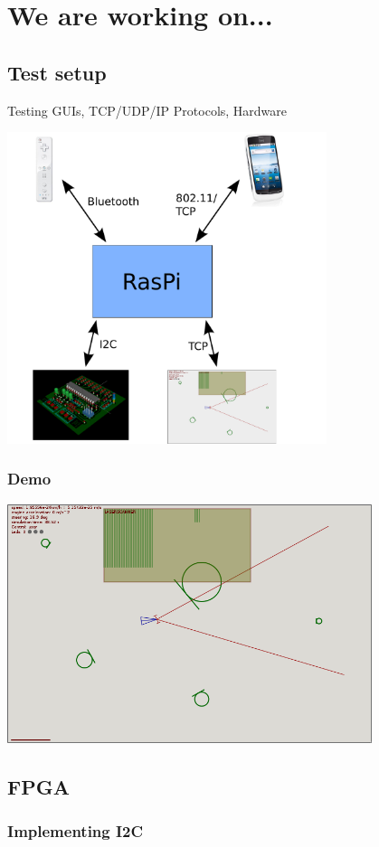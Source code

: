 \documentclass[pdf]{beamer}
\begin{document}
\section{We are working on...}
\subsection{Test setup}
\begin{frame}
Testing GUIs, TCP/UDP/IP Protocols, Hardware
  \begin{center}
  \includegraphics[width = 0.7\textwidth]{pics/raw/software2.pdf}
  \end{center}
\end{frame}
\begin{frame}
\frametitle{Demo}
  \begin{center}
  \includegraphics[width = 0.8\textwidth]{pics/raw/sim.png}
  \end{center}
\end{frame}
\subsection{FPGA}
\begin{frame}
\frametitle{Implementing I2C}
\end{frame}
\end{document}

